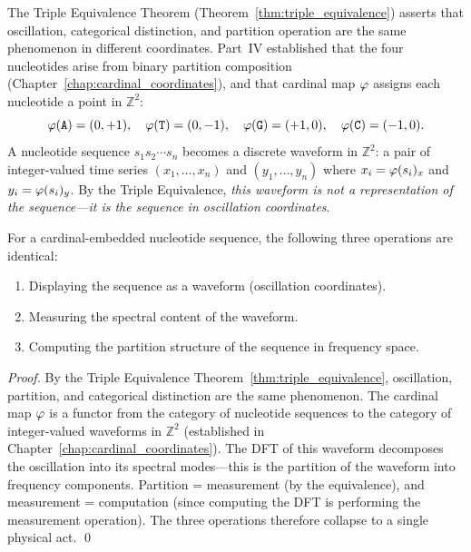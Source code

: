 The Triple Equivalence Theorem (Theorem~\ref{thm:triple_equivalence}) asserts
that oscillation, categorical distinction, and partition operation are the same
phenomenon in different coordinates. Part~IV established that the four
nucleotides arise from binary partition composition
(Chapter~\ref{chap:cardinal_coordinates}), and that cardinal map $\varphi$
assigns each nucleotide a point in $\mathbb{Z}^2$:
\begin{equation}
  \varphi(\mathtt{A}) = (0,+1),\quad
  \varphi(\mathtt{T}) = (0,-1),\quad
  \varphi(\mathtt{G}) = (+1,0),\quad
  \varphi(\mathtt{C}) = (-1,0).
  \label{eq:cardinal_map}
\end{equation}
A nucleotide sequence $s_1 s_2 \cdots s_n$ becomes a discrete waveform in
$\mathbb{Z}^2$: a pair of integer-valued time series $(x_1,\ldots,x_n)$ and
$(y_1,\ldots,y_n)$ where $x_i = \varphi(s_i)_x$ and $y_i = \varphi(s_i)_y$.
By the Triple Equivalence, \emph{this waveform is not a representation of the
sequence---it is the sequence in oscillation coordinates}.

\begin{proposition}
\label{prop:obs_comp_identity}
For a cardinal-embedded nucleotide sequence, the following three operations
are identical:
\begin{enumerate}[label=(\roman*)]
  \item Displaying the sequence as a waveform (oscillation coordinates).
  \item Measuring the spectral content of the waveform.
  \item Computing the partition structure of the sequence in frequency space.
\end{enumerate}
\end{proposition}

\begin{proof}
By the Triple Equivalence Theorem~\ref{thm:triple_equivalence}, oscillation,
partition, and categorical distinction are the same phenomenon. The cardinal
map $\varphi$ is a functor from the category of nucleotide sequences to the
category of integer-valued waveforms in $\mathbb{Z}^2$ (established in
Chapter~\ref{chap:cardinal_coordinates}). The DFT of this waveform decomposes
the oscillation into its spectral modes---this is the partition of the waveform
into frequency components. Partition = measurement (by the equivalence), and
measurement = computation (since computing the DFT is performing the measurement
operation). The three operations therefore collapse to a single physical act. \qed
\end{proof}

